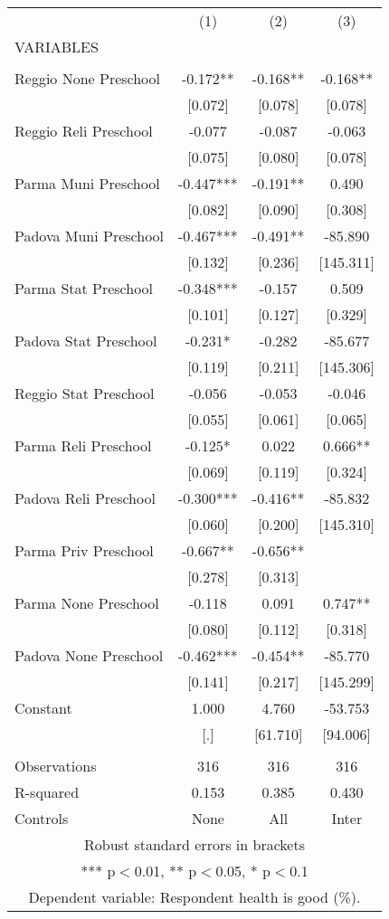 \begin{tabular}{lccc} \hline
 & (1) & (2) & (3) \\
VARIABLES &  &  &  \\ \hline
 &  &  &  \\
Reggio None Preschool & -0.172** & -0.168** & -0.168** \\
 & [0.072] & [0.078] & [0.078] \\
Reggio Reli Preschool & -0.077 & -0.087 & -0.063 \\
 & [0.075] & [0.080] & [0.078] \\
Parma Muni Preschool & -0.447*** & -0.191** & 0.490 \\
 & [0.082] & [0.090] & [0.308] \\
Padova Muni Preschool & -0.467*** & -0.491** & -85.890 \\
 & [0.132] & [0.236] & [145.311] \\
Parma Stat Preschool & -0.348*** & -0.157 & 0.509 \\
 & [0.101] & [0.127] & [0.329] \\
Padova Stat Preschool & -0.231* & -0.282 & -85.677 \\
 & [0.119] & [0.211] & [145.306] \\
Reggio Stat Preschool & -0.056 & -0.053 & -0.046 \\
 & [0.055] & [0.061] & [0.065] \\
Parma Reli Preschool & -0.125* & 0.022 & 0.666** \\
 & [0.069] & [0.119] & [0.324] \\
Padova Reli Preschool & -0.300*** & -0.416** & -85.832 \\
 & [0.060] & [0.200] & [145.310] \\
Parma Priv Preschool & -0.667** & -0.656** &  \\
 & [0.278] & [0.313] &  \\
Parma None Preschool & -0.118 & 0.091 & 0.747** \\
 & [0.080] & [0.112] & [0.318] \\
Padova None Preschool & -0.462*** & -0.454** & -85.770 \\
 & [0.141] & [0.217] & [145.299] \\
Constant & 1.000 & 4.760 & -53.753 \\
 & [.] & [61.710] & [94.006] \\
 &  &  &  \\
Observations & 316 & 316 & 316 \\
R-squared & 0.153 & 0.385 & 0.430 \\
 Controls & None & All & Inter \\ \hline
\multicolumn{4}{c}{ Robust standard errors in brackets} \\
\multicolumn{4}{c}{ *** p$<$0.01, ** p$<$0.05, * p$<$0.1} \\
\multicolumn{4}{c}{ Dependent variable: Respondent health is good (\%).} \\
\end{tabular}
